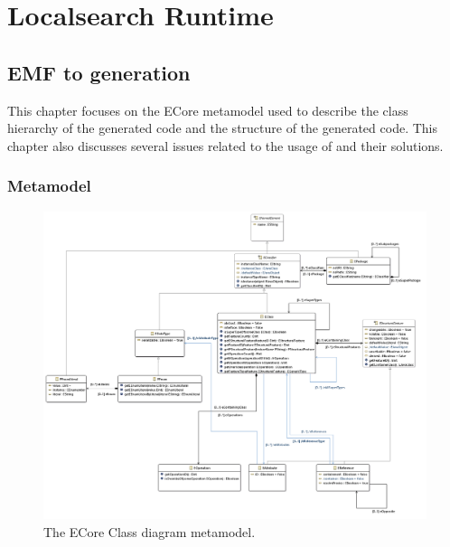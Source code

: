 \chapter{Localsearch Runtime}
\section{EMF to \CPP{} generation} \label{sect:CppObjectModel}

This chapter focuses on the ECore metamodel used to describe the class hierarchy
of the generated code and the structure of the generated code. This chapter also
discusses several issues related to the usage of \CPP{} and their solutions.

\subsection{Metamodel}\label{sec:Metamodel}

\begin{figure}[!ht]
\centering
\includegraphics[width=145mm, keepaspectratio]{figures/ecore_diagram.png}
\caption{The ECore Class diagram metamodel.}
\label{fig:metamodel}
\end{figure}

